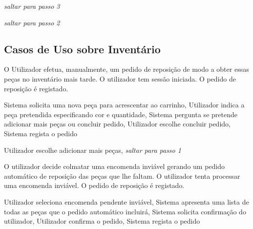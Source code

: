             {
                \textit{saltar para passo 3}
            }

            {
               \textit{saltar para passo 2}
            }
        \newpage
        \subsection{Casos de Uso sobre Inventário}
            
                {O Utilizador efetua, manualmente, um pedido de reposição de modo a obter essas peças no inventário mais tarde.}
                {O utilizador tem sessão iniciada.}
                {O pedido de reposição é registado.}

            {   
                Sistema solicita uma nova peça para acrescentar ao carrinho,
                Utilizador indica a peça pretendida especificando cor e quantidade,
                Sistema pergunta se pretende adicionar mais peças ou concluir pedido,
                Utilizador escolhe concluir pedido,
                Sistema regista o pedido
            }

            {
                Utilizador escolhe adicionar mais peças,
                \textit{saltar para passo 1}
            }

            \newpage
                {O utilizador decide colmatar uma encomenda inviável gerando um pedido automático de reposição das peças que lhe faltam.}
                {O utilizador tenta processar uma encomenda inviável.}
                {O pedido de reposição é registado.}

            {
                Utilizador seleciona encomenda pendente inviável,
                Sistema apresenta uma lista de todas as peças que o pedido automático incluirá,
                Sistema solicita confirmação do utilizador,
                Utilizador confirma o pedido,
                Sistema regista o pedido
            }

